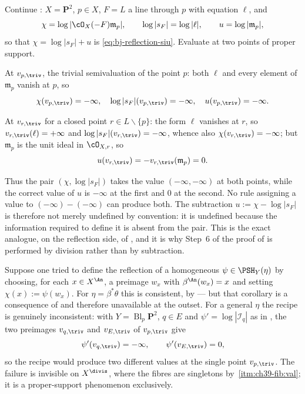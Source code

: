 \begin{example}
\label{ex:ch39-subtraction-fails}
Continue : $X=\mathbf P^2$,
$p\in X$, $F=L$ a line through $p$ with equation $\ell$, and
\[
 \chi=\log|\cO_X(-F)\mathfrak m_p|,\qquad
 \log|s_F|=\log|\ell|,\qquad
 u=\log|\mathfrak m_p| ,
\]
so that $\chi=\log|s_F|+u$ is \eqref{eq:bj-reflection-siu}.  Evaluate at
two points of proper support.

At $v_{p,\triv}$, the trivial semivaluation of the point $p$: both
$\ell$ and every element of $\mathfrak m_p$ vanish at $p$, so
\[
 \chi(v_{p,\triv})=-\infty,\quad
 \log|s_F|(v_{p,\triv})=-\infty,\quad
 u(v_{p,\triv})=-\infty .
\]

At $v_{r,\triv}$ for a closed point $r\in L\smallsetminus\{p\}$: the
form $\ell$ vanishes at $r$, so $v_{r,\triv}(\ell)=+\infty$ and
$\log|s_F|(v_{r,\triv})=-\infty$, whence also
$\chi(v_{r,\triv})=-\infty$; but $\mathfrak m_p$ is the unit ideal in
$\cO_{X,r}$, so
\[
 u(v_{r,\triv})=-v_{r,\triv}(\mathfrak m_p)=0 .
\]

Thus the pair $(\chi,\log|s_F|)$ takes the value
$(-\infty,-\infty)$ at both points, while the correct value of $u$ is
$-\infty$ at the first and $0$ at the second.  No rule assigning a value
to $(-\infty)-(-\infty)$ can produce both.  The subtraction
$u:=\chi-\log|s_F|$ is therefore not merely undefined by convention: it is
undefined because the information required to define it is absent from the
pair.  This is the exact analogue, on the reflection side, of
, and it is why Step~6 of the proof of
 is performed by division rather than by
subtraction.
\end{example}

\begin{example}
\label{ex:ch39-naive-fibre-definition}
Suppose one tried to define the reflection of a homogeneous
$\psi\in\PSH_Y(\eta)$ by choosing, for each $x\in X^{\An}$, a
preimage $w_x$ with
$\beta^{\An}(w_x)=x$ and setting $\chi(x):=\psi(w_x)$.  For
$\eta=\beta^*\theta$ this is consistent, by
 --- but that corollary is a consequence of
 and therefore unavailable at the
outset.  For a general $\eta$ the recipe is genuinely inconsistent: with
$Y=\operatorname{Bl}_p\mathbf P^2$, $q\in E$ and
$\psi'=\log|\mathcal I_q|$ as in , the
two preimages $v_{q,\triv}$ and $v_{E,\triv}$ of $v_{p,\triv}$ give
\[
 \psi'(v_{q,\triv})=-\infty,
 \qquad
 \psi'(v_{E,\triv})=0 ,
\]
so the recipe would produce two different values at the single point
$v_{p,\triv}$.  The failure is invisible on $X^{\divis}$, where the
fibres are singletons by
\,\cref{itm:ch39-fib:val}; it is a proper-support
phenomenon exclusively.
\end{example}


